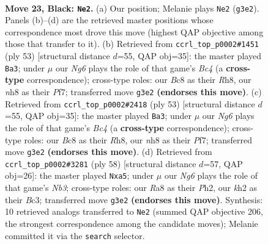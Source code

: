 \documentclass[11pt]{article}
\begin{document}
\clearpage

\begin{figure}[p]\centering
\begin{subfigure}{0.46\textwidth}\centering
\resizebox{\linewidth}{!}{%
\newchessgame
\chessboard[
  setfen={r1b4N/2k5/2p1p1p1/P1b4p/1p3P1P/4P1n1/7K/RNB5 b - - 3 23},
  showmover=false,
  pgfstyle=straightmove, color=movearrow, markmove={g3-e2}
]}
\caption{}
\end{subfigure}\hfill
\begin{subfigure}{0.46\textwidth}\centering
\resizebox{\linewidth}{!}{%
\newchessgame
\chessboard[
  setfen={1k5r/pp3p1p/2p5/Pnb2N2/2K2P2/4P3/5PBP/R7 b - - 6 27},
  showmover=false,
  pgfstyle=straightmove, color=movearrow, markmove={c5-a3}
]}
\caption{}
\end{subfigure}
\\[4pt]
\begin{subfigure}{0.46\textwidth}\centering
\resizebox{\linewidth}{!}{%
\newchessgame
\chessboard[
  setfen={1k5r/pp3p1p/2p5/Pnb2N2/2K2P2/4P3/5PBP/R7 b - - 5 27},
  showmover=false,
  pgfstyle=straightmove, color=movearrow, markmove={c5-a3}
]}
\caption{}
\end{subfigure}\hfill
\begin{subfigure}{0.46\textwidth}\centering
\resizebox{\linewidth}{!}{%
\newchessgame
\chessboard[
  setfen={2R5/3rbppk/4p2p/p7/pn2P3/1NB3P1/1P3P1P/5K2 w - - 0 30},
  showmover=false,
  pgfstyle=straightmove, color=movearrow, markmove={b3-a5}
]}
\caption{}
\end{subfigure}
\caption{\textbf{Move 23, Black: \texttt{Ne2}.} (a) Our position; Melanie plays \texttt{Ne2} (\texttt{g3e2}). Panels (b)--(d) are the retrieved master positions whose correspondence most drove this move (highest QAP objective among those that transfer to it). (b) Retrieved from \texttt{ccrl\_top\_p0002\#1451} (ply 53) [structural distance $d$=55, QAP obj=35]: the master played \texttt{Ba3}; under $\mu$ our \emph{Ng6} plays the role of that game's \emph{Bc4} (a \textbf{cross-type} correspondence); cross-type roles: our \emph{B}c8 as their \emph{R}h8, our \emph{n}h8 as their \emph{P}f7; transferred move \texttt{g3e2} \textbf{(endorses this move)}. (c) Retrieved from \texttt{ccrl\_top\_p0002\#2418} (ply 53) [structural distance $d$=55, QAP obj=35]: the master played \texttt{Ba3}; under $\mu$ our \emph{Ng6} plays the role of that game's \emph{Bc4} (a \textbf{cross-type} correspondence); cross-type roles: our \emph{B}c8 as their \emph{R}h8, our \emph{n}h8 as their \emph{P}f7; transferred move \texttt{g3e2} \textbf{(endorses this move)}. (d) Retrieved from \texttt{ccrl\_top\_p0002\#3281} (ply 58) [structural distance $d$=57, QAP obj=26]: the master played \texttt{Nxa5}; under $\mu$ our \emph{Ng6} plays the role of that game's \emph{Nb3}; cross-type roles: our \emph{R}a8 as their \emph{P}h2, our \emph{k}h2 as their \emph{B}c3; transferred move \texttt{g3e2} \textbf{(endorses this move)}. Synthesis: 10 retrieved analogs transferred to \texttt{Ne2} (summed QAP objective 206, the strongest correspondence among the candidate moves); Melanie committed it via the \texttt{search} selector.}
\label{fig:thought-m45}
\end{figure}
\end{document}
